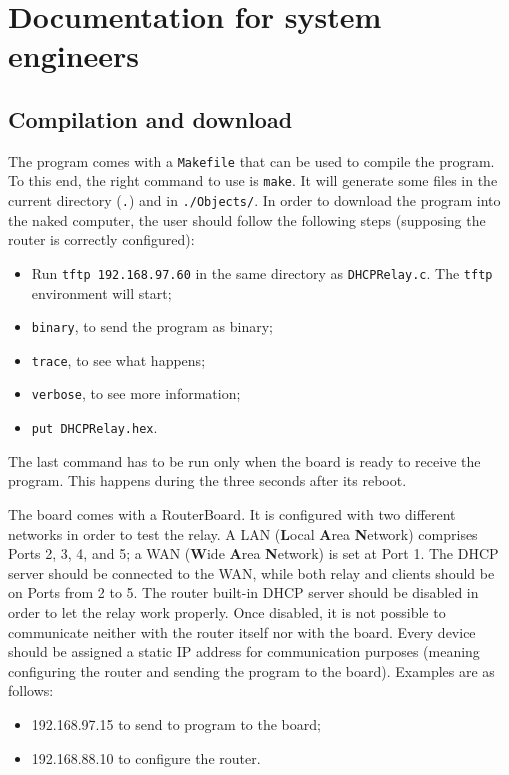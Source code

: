 \section{Documentation for system engineers}
\subsection{Compilation and download}
The program comes with a \texttt{Makefile} that can be used to compile the program. To this end, the right command to use is \texttt{make}. It will generate some files in the current directory (\texttt{.}) and in \texttt{./Objects/}. In order to download the program into the naked computer, the user should follow the following steps (supposing the router is correctly configured):
\begin{itemize}
	\item Run \texttt{tftp 192.168.97.60} in the same directory as \texttt{DHCPRelay.c}. The \texttt{tftp} environment will start;
	\item \texttt{binary}, to send the program as binary;
	\item \texttt{trace}, to see what happens;
	\item \texttt{verbose}, to see more information;
	\item \texttt{put DHCPRelay.hex}.
\end{itemize}
The last command has to be run only when the board is ready to receive the program. This happens during the three seconds after its reboot.

The board comes with a RouterBoard. It is configured with two different networks in order to test the relay. A LAN (\textbf{L}ocal \textbf{A}rea \textbf{N}etwork) comprises Ports 2, 3, 4, and 5; a WAN (\textbf{W}ide \textbf{A}rea \textbf{N}etwork) is set at Port 1. The DHCP server should be connected to the WAN, while both relay and clients should be on Ports from 2 to 5. The router built-in DHCP server should be disabled in order to let the relay work properly. Once disabled, it is not possible to communicate neither with the router itself nor with the board. Every device should be assigned a static IP address for communication purposes (meaning configuring the router and sending the program to the board). Examples are as follows:
\begin{itemize}
	\item 192.168.97.15 to send to program to the board;
	\item 192.168.88.10 to configure the router.
\end{itemize}

